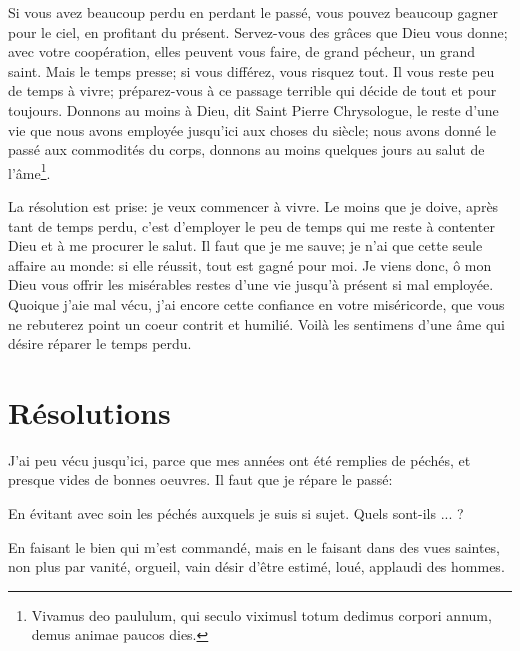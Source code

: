 \documentclass[instructions.tex]{subfiles}
\begin{document}
Si vous avez beaucoup perdu en perdant le passé, vous pouvez beaucoup gagner pour le ciel, en profitant du présent. Servez-vous des grâces que Dieu vous donne; avec votre coopération, elles peuvent vous faire, de grand pécheur, un grand saint. Mais le temps presse; si vous différez, vous risquez tout. Il vous reste peu de temps à vivre; préparez-vous à ce passage terrible qui décide de tout et pour toujours. Donnons au moins à Dieu, dit Saint Pierre Chrysologue, le reste d'une vie que nous avons employée jusqu'ici aux choses du siècle; nous avons donné le passé aux commodités du corps, donnons au moins quelques jours au salut de l'âme\footnote{Vivamus deo paululum, qui seculo viximusl totum dedimus corpori annum, demus animae paucos dies.}. 

La résolution est prise: je veux commencer à vivre. Le moins que je doive, après tant de temps perdu, c'est d'employer le peu de temps qui me reste à contenter Dieu et à me procurer le salut. Il faut que je me sauve; je n'ai que cette seule affaire au monde: si elle réussit, tout est gagné pour moi. Je viens donc, ô mon Dieu vous offrir les misérables restes d'une vie jusqu'à présent si mal employée. Quoique j'aie mal vécu, j'ai encore cette confiance en votre miséricorde, que vous ne rebuterez point un coeur contrit et humilié. Voilà les sentimens d'une âme qui désire réparer le temps perdu.


\section{Résolutions}

J'ai peu vécu jusqu'ici, parce que mes années ont été remplies de péchés, et presque vides de bonnes oeuvres. Il faut que je répare le passé:

\primo En évitant avec soin les péchés auxquels je suis si sujet. Quels sont-ils ... ?

\secundo En faisant le bien qui m'est commandé, mais en le faisant dans des vues saintes, non plus par vanité, orgueil, vain désir d'être estimé, loué, applaudi des hommes. 

\end{document}
